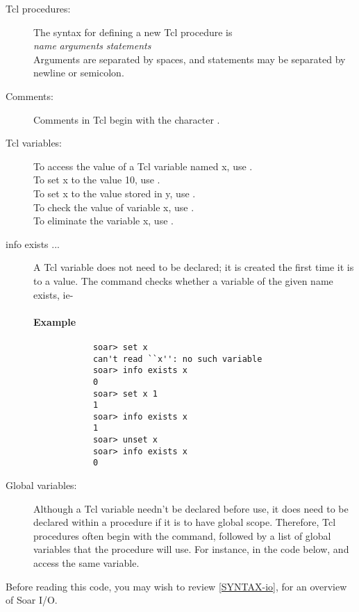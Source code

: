 \begin{description}
\item[Tcl procedures:] The syntax for defining a new Tcl procedure is \\
			 \emph{name} \soar{ \{ } \emph{arguments} \soar{ \} \{ } 
			\emph{ statements } \soar{ \} } \\
			Arguments are separated by spaces, and statements may be separated by newline or semicolon.			
\item[Comments:] Comments in Tcl begin with the character \soar{\#}.
\item[Tcl variables:] To access the value of a Tcl variable named x, use . \\
                     To set x to the value 10, use . \\
                     To set x to the value stored in y, use . \\
                     To check the value of variable x, use . \\
                     To eliminate the variable x, use .
\item[info exists ...] A Tcl variable does not need to be declared; it is created the first time it is
			 to a value. The  command checks whether a variable of the
			given name exists, ie-
			
			\paragraph{Example}
			\begin{verbatim}
			soar> set x
			can't read ``x'': no such variable
			soar> info exists x
			0
			soar> set x 1
			1
			soar> info exists x
			1
			soar> unset x
			soar> info exists x
			0
			\end{verbatim}

\item[Global variables:] Although a Tcl variable needn't be declared before use, it does need to be declared
			within a procedure if it is to have global scope. Therefore, Tcl procedures often begin
			with the  command, followed by a list of global variables that the procedure
			will use. For instance, in the code below,  and 
			access the same  variable.
\end{description}

Before reading this code, you may wish to review \ref{SYNTAX-io}, for an overview of Soar I/O.

